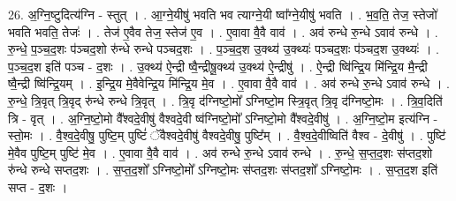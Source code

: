 \documentclass[17pt]{extarticle}
\begin{document}
26. अ॒ग्नि॒ष्टुदित्य॑ग्नि - स्तुत् । . आ॒ग्ने॒यीषु॑ भवति भव त्याग्ने॒यी ष्वा᳚ग्ने॒यीषु॑ भवति । . भ॒व॒ति॒ तेज॒ स्तेजो॑ भवति भवति॒ तेजः॑ । . तेज॑ ए॒वैव तेज॒ स्तेज॑ ए॒व । . ए॒वावा वै॒वै वाव॑ । . अव॑ रुन्धे रु॒न्धे ऽवाव॑ रुन्धे । . रु॒न्धे॒ प॒ञ्च॒द॒शः प॑ञ्चद॒शो रु॑न्धे रुन्धे पञ्चद॒शः । . प॒ञ्च॒द॒श उ॒क्थ्य॑ उ॒क्थ्यः॑ पञ्चद॒शः प॑ञ्चद॒श उ॒क्थ्यः॑ । . प॒ञ्च॒द॒श इति॑ पञ्च - द॒शः । . उ॒क्थ्य॑ ऐ॒न्द्री ष्वै॒न्द्रीषू॒क्थ्य॑ उ॒क्थ्य॑ ऐ॒न्द्रीषु॑ । . ऐ॒न्द्री ष्वि॑न्द्रि॒य मि॑न्द्रि॒य मै॒न्द्री ष्वै॒न्द्री ष्वि॑न्द्रि॒यम् । . इ॒न्द्रि॒य मे॒वैवेन्द्रि॒य मि॑न्द्रि॒य मे॒व । . ए॒वावा वै॒वै वाव॑ । . अव॑ रुन्धे रु॒न्धे ऽवाव॑ रुन्धे । . रु॒न्धे॒ त्रि॒वृत् त्रि॒वृद् रु॑न्धे रुन्धे त्रि॒वृत् । . त्रि॒वृ द॑ग्निष्टो॒मो᳚ ऽग्निष्टो॒म स्त्रि॒वृत् त्रि॒वृ द॑ग्निष्टो॒मः । . त्रि॒व॒दिति॑ त्रि - वृत् । . अ॒ग्नि॒ष्टो॒मो वै᳚श्वदे॒वीषु॑ वैश्वदे॒वी ष्व॑ग्निष्टो॒मो᳚ ऽग्निष्टो॒मो वै᳚श्वदे॒वीषु॑ । . अ॒ग्नि॒ष्टो॒म इत्य॑ग्नि - स्तो॒मः । . वै॒श्व॒दे॒वीषु॒ पुष्टि॒म् पुष्टिं॑ ॅवैश्वदे॒वीषु॑ वैश्वदे॒वीषु॒ पुष्टि᳚म् । . वै॒श्व॒दे॒वीष्विति॑ वैश्व - दे॒वीषु॑ । . पुष्टि॑ मे॒वैव पुष्टि॒म् पुष्टि॑ मे॒व । . ए॒वावा वै॒वै वाव॑ । . अव॑ रुन्धे रु॒न्धे ऽवाव॑ रुन्धे । . रु॒न्धे॒ स॒प्त॒द॒शः स॑प्तद॒शो रु॑न्धे रुन्धे सप्तद॒शः । . स॒प्त॒द॒शो᳚ ऽग्निष्टो॒मो᳚ ऽग्निष्टो॒मः स॑प्तद॒शः स॑प्तद॒शो᳚ ऽग्निष्टो॒मः । . स॒प्त॒द॒श इति॑ सप्त - द॒शः । \newline
\end{document}
